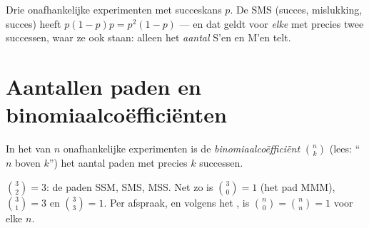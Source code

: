 \begin{example}\label{ex:g11:binom:threetrials}
Drie onafhankelijke experimenten met succeskans $p$. De  SMS (succes,
mislukking, succes) heeft  $p(1-p)p = p^2(1-p)$ --- en dat geldt voor
\emph{elke}  met precies twee successen, waar ze ook staan: alleen het
\emph{aantal} S'en en M'en telt.
\end{example}

\section{Aantallen paden en binomiaalcoëfficiënten}

\begin{definition}[Binomiaalcoëfficiënt]\label{def:g11:binom:coefficient}
In het  van $n$ onafhankelijke experimenten is de
\emph{binomiaalcoëfficiënt} $\binom{n}{k}$ (lees:
``$n$ boven $k$'') het aantal paden met precies $k$ successen.
\end{definition}

\begin{example}
$\binom{3}{2} = 3$: de paden SSM, SMS, MSS. Net zo is $\binom{3}{0} = 1$ (het
pad MMM), $\binom{3}{1} = 3$ en $\binom{3}{3} = 1$. Per afspraak, en volgens
het , is $\binom n0 = \binom nn = 1$ voor elke $n$.
\end{example}

